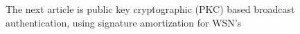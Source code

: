 \tiny

The next article is public key cryptographic (PKC)  based broadcast authentication, using signature amortization for WSN's